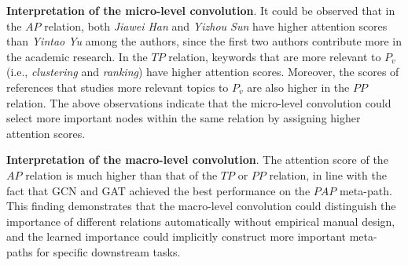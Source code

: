 \textbf{Interpretation of the micro-level convolution}.  
It could be observed that in the $AP$ relation, both \textit{Jiawei Han} and \textit{Yizhou Sun} have higher attention scores than \textit{Yintao Yu} among the authors, since the first two authors contribute more in the academic research. In the $TP$ relation, keywords that are more relevant to $P_v$ (i.e., \textit{clustering} and \textit{ranking}) have higher attention scores. Moreover, the scores of references that studies more relevant topics to $P_v$ are also higher in the $PP$ relation. The above observations indicate that the micro-level convolution could select more important nodes within the same relation by assigning higher attention scores. 

\textbf{Interpretation of the macro-level convolution}.
The attention score of the $AP$ relation is much higher than that of the $TP$ or $PP$ relation, in line with the fact that GCN and GAT achieved the best performance on the $PAP$ meta-path. This finding demonstrates that the macro-level convolution could distinguish the importance of different relations automatically without empirical manual design, and the learned importance could implicitly construct more important meta-paths for specific downstream tasks.